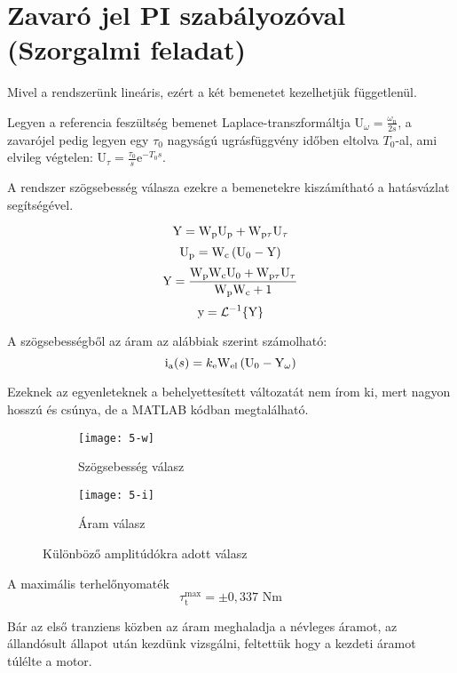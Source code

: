 \section{Zavaró jel PI szabályozóval (Szorgalmi feladat)}\label{sec:szorg-pi}

Mivel a rendszerünk lineáris, ezért a két bemenetet kezelhetjük függetlenül.

Legyen a referencia feszültség bemenet Laplace-transzformáltja
$\mathrm{U}_\omega = \frac{\omega_\text{n}}{2s}$,
a zavarójel pedig legyen egy $\tau_0$ nagyságú ugrásfüggvény időben eltolva $T_0$-al,
ami elvileg végtelen: $\mathrm{U}_\tau=\frac{\tau_0}{s}\text{e}^{-T_0s}$.

A rendszer szögsebesség válasza ezekre a bemenetekre kiszámítható a hatásvázlat segítségével.

\begin{equation}
	\mathrm{Y} = \mathrm{W}_\text{p}\mathrm{U}_\text{p} + \mathrm{W}_{\text{p}\tau}\mathrm{U}_\tau
\end{equation}
\begin{equation}
	\mathrm{U}_\text{p} = \mathrm{W}_\text{c}\left(\mathrm{U}_0 - \mathrm{Y}\right)
\end{equation}
\begin{equation}
	\mathrm{Y} = \frac{\mathrm{W}_\text{p}\mathrm{W}_\text{c}\mathrm{U}_0 + \mathrm{W}_{\text{p}\tau}\mathrm{U}_\tau}{\mathrm{W}_\text{p}\mathrm{W}_\text{c} +1}
\end{equation}
\begin{equation}
	\mathrm{y} = \mathcal{L}^{-1}\{\mathrm{Y}\}
\end{equation}

A szögsebességből az áram az alábbiak szerint számolható:
\begin{equation}
	\mathrm{i}_\text{a}(s) = k_\text{e}\mathrm{W}_\text{el}\left(\mathrm{U}_0 - \mathrm{Y}_\omega\right)
\end{equation}

Ezeknek az egyenleteknek a behelyettesített változatát nem írom ki, mert
nagyon hosszú és csúnya, de a MATLAB kódban megtalálható.

\begin{figure}[H]
	\centering
	\begin{subfigure}{.49\textwidth}
		\texttt{[image: 5-w]}
		\caption{Szögsebesség válasz}
	\end{subfigure}
	\begin{subfigure}{.49\textwidth}
		\texttt{[image: 5-i]}
		\caption{Áram válasz}
	\end{subfigure}
	\caption{Különböző amplitúdókra adott válasz}
	\label{fig:szorg1}
\end{figure}

A maximális terhelőnyomaték
\begin{equation}
	\tau_\text{t}^\text{max} = \pm0,337\text{ Nm}
\end{equation}

Bár az első tranziens közben az áram meghaladja a névleges áramot, az állandósult állapot
után kezdünk vizsgálni, feltettük hogy a kezdeti áramot túlélte a motor.
